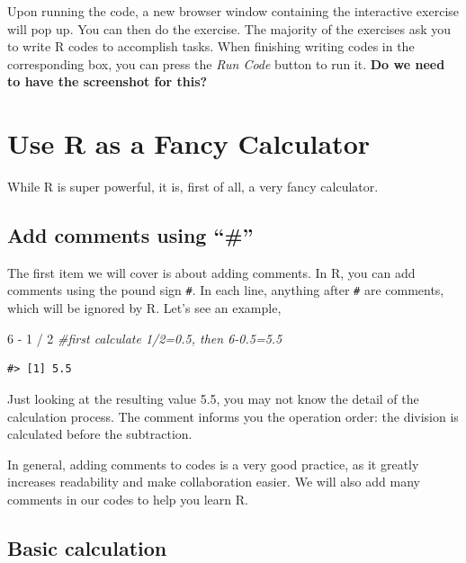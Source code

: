 \documentclass[
]{book}
\newenvironment{Shaded}{\begin{snugshade}}{\end{snugshade}}
\newcommand{\CommentTok}[1]{\textcolor[rgb]{0.56,0.35,0.01}{\textit{#1}}}
\newcommand{\DecValTok}[1]{\textcolor[rgb]{0.00,0.00,0.81}{#1}}
\newcommand{\SpecialCharTok}[1]{\textcolor[rgb]{0.00,0.00,0.00}{#1}}
\begin{document}
Upon running the code, a new browser window containing the interactive exercise will pop up. You can then do the exercise. The majority of the exercises ask you to write R codes to accomplish tasks. When finishing writing codes in the corresponding box, you can press the \emph{Run Code} button to run it. \textbf{Do we need to have the screenshot for this?}

\hypertarget{Calculator}{%
\section{Use R as a Fancy Calculator}\label{Calculator}}

While R is super powerful, it is, first of all, a very fancy calculator.

\hypertarget{add-comments-using}{%
\subsection{Add comments using ``\#''}\label{add-comments-using}}

The first item we will cover is about adding comments. In R, you can add comments using the pound sign \texttt{\#}. In each line, anything after \texttt{\#} are comments, which will be ignored by R. Let's see an example,

\begin{Shaded}
\begin{Highlighting}[]
\DecValTok{6} \SpecialCharTok{{-}} \DecValTok{1} \SpecialCharTok{/} \DecValTok{2} \CommentTok{\#first calculate 1/2=0.5, then 6{-}0.5=5.5}
\end{Highlighting}
\end{Shaded}

\begin{verbatim}
#> [1] 5.5
\end{verbatim}

Just looking at the resulting value 5.5, you may not know the detail of the calculation process. The comment informs you the operation order: the division is calculated before the subtraction.

In general, adding comments to codes is a very good practice, as it greatly increases readability and make collaboration easier. We will also add many comments in our codes to help you learn R.

\hypertarget{basic-calculation}{%
\subsection{Basic calculation}\label{basic-calculation}}
\end{document}
